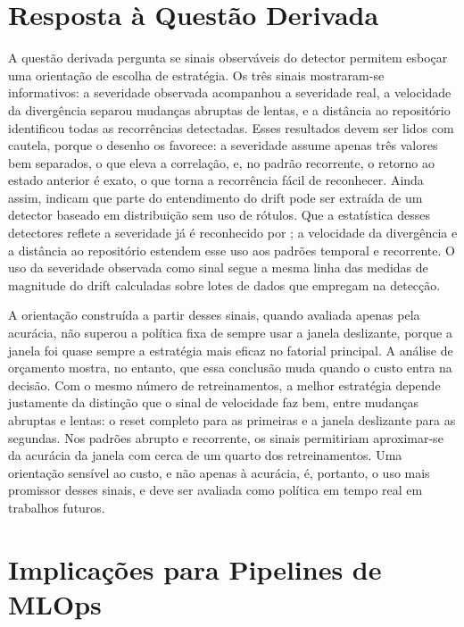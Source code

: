 \section{Resposta à Questão Derivada}

A questão derivada pergunta se sinais observáveis do detector permitem
esboçar uma orientação de escolha de estratégia. Os três sinais mostraram-se
informativos: a severidade observada acompanhou a severidade real, a
velocidade da divergência separou mudanças abruptas de lentas, e a distância
ao repositório identificou todas as recorrências detectadas. Esses resultados
devem ser lidos com cautela, porque o desenho os favorece: a severidade
assume apenas três valores bem separados, o que eleva a correlação, e, no
padrão recorrente, o retorno ao estado anterior é exato, o que torna a
recorrência fácil de reconhecer. Ainda assim, indicam que parte do
entendimento do drift pode ser extraída de um detector baseado em
distribuição sem uso de rótulos. Que a estatística desses detectores reflete
a severidade já é reconhecido por ; a velocidade da
divergência e a distância ao repositório estendem esse uso aos padrões
temporal e recorrente. O uso da severidade observada como sinal segue a
mesma linha das medidas de magnitude do drift calculadas sobre lotes de
dados que  empregam na detecção.

A orientação construída a partir desses sinais, quando avaliada apenas pela
acurácia, não superou a política fixa de sempre usar a janela deslizante,
porque a janela foi quase sempre a estratégia mais eficaz no fatorial
principal. A análise de orçamento mostra, no entanto, que essa conclusão
muda quando o custo entra na decisão. Com o mesmo número de retreinamentos,
a melhor estratégia depende justamente da distinção que o sinal de
velocidade faz bem, entre mudanças abruptas e lentas: o reset completo para
as primeiras e a janela deslizante para as segundas. Nos padrões abrupto e
recorrente, os sinais permitiriam aproximar-se da acurácia da janela com
cerca de um quarto dos retreinamentos. Uma orientação sensível ao custo, e não apenas
à acurácia, é, portanto, o uso mais promissor desses sinais, e deve ser
avaliada como política em tempo real em trabalhos futuros.

\section{Implicações para Pipelines de MLOps}

